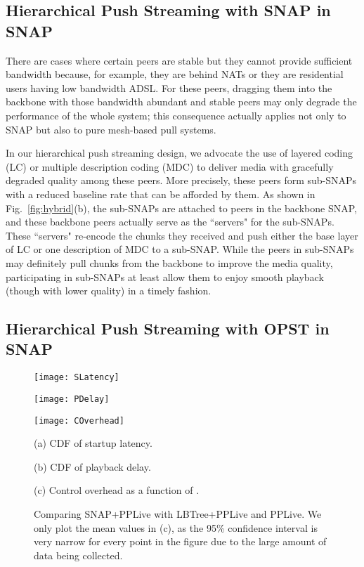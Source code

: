 \documentclass[conference]{IEEEtran}
\begin{document}
\subsection{Hierarchical Push Streaming with SNAP in SNAP}
  There are cases where certain peers are stable but they cannot provide sufficient bandwidth because, for example, they are behind NATs or they are residential users having low bandwidth ADSL. For these peers, dragging them into the backbone with those bandwidth abundant and stable peers may only degrade the performance of the whole system; this consequence actually applies not only to SNAP but also to pure mesh-based pull systems.

  In our hierarchical push streaming design, we advocate the use of layered coding (LC) \cite{WienCGHA-TCSVT07} or multiple description coding (MDC) \cite{Goyal-SPMag01} to deliver media with gracefully degraded quality among these peers. More precisely, these peers form sub-SNAPs with a reduced baseline rate  that can be afforded by them. As shown in Fig.~\ref{fig:hybrid}(b), the sub-SNAPs are attached to peers in the backbone SNAP, and these backbone peers actually serve as the ``servers" for the sub-SNAPs. These ``servers" re-encode the chunks they received and push either the base layer of LC or one description of MDC to a sub-SNAP. While the peers in sub-SNAPs may definitely pull chunks from the backbone to improve the media quality, participating in sub-SNAPs at least allow them to enjoy smooth playback (though with lower quality) in a timely fashion.

\subsection{Hierarchical Push Streaming with OPST in SNAP}
\begin{figure*}[ht]
   \begin{center}
       \parbox{\textwidth}{\parbox{.33\textwidth}{\center\texttt{[image: SLatency]}}
                           \parbox{.33\textwidth}{\center\texttt{[image: PDelay]}}
                           \parbox{.33\textwidth}{\center\texttt{[image: COverhead]}}}
       \vspace{-2mm}
       \parbox{\textwidth}{\parbox{.33\textwidth}{\center\scriptsize(a) CDF of startup  latency.}
                           \parbox{.33\textwidth}{\center\scriptsize(b) CDF of playback delay.}
                           \parbox{.33\textwidth}{\center\footnotesize(c) Control overhead as a function of .}}
       \vspace{-2ex}
    \caption{Comparing SNAP+PPLive with LBTree+PPLive and PPLive. We only plot the mean values in (c), as the 95\% confidence interval is very narrow for every point in the figure due to the large amount of data being collected.}\label{fig:comp}
   \end{center}
   \vspace{-2ex}
  \end{figure*}
\end{document}
